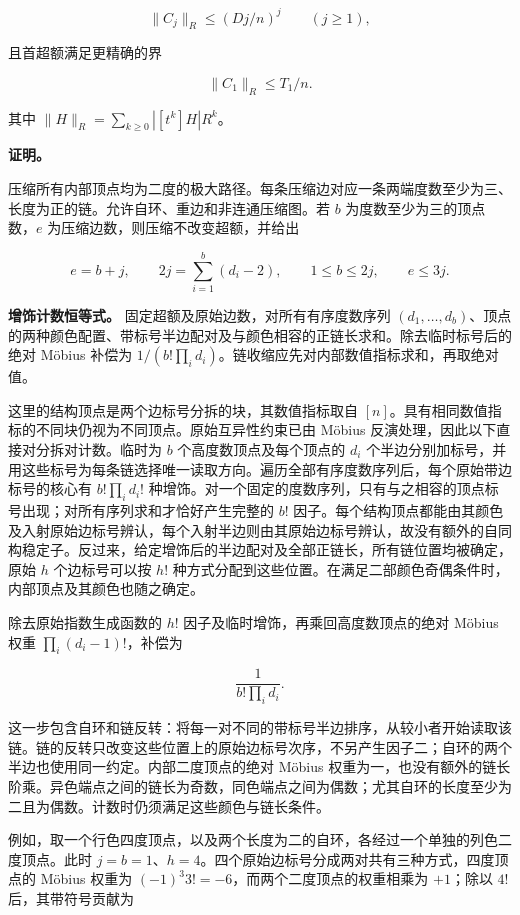 \documentclass[11pt,a4paper]{article}
\begin{document}

\begin{equation}
\|C_j\|_R\le(Dj/n)^j\qquad(j\ge1),
\tag{3.2}
\label{eq-core-activity}
\end{equation}

且首超额满足更精确的界

\[\|C_1\|_R\le T_1/n.\]

其中 \(\|H\|_R=\sum_{k\ge0}|[t^k]H|R^k\)。

\textbf{证明。}

压缩所有内部顶点均为二度的极大路径。每条压缩边对应一条两端度数至少为三、长度为正的链。允许自环、重边和非连通压缩图。若 \(b\) 为度数至少为三的顶点数，\(e\) 为压缩边数，则压缩不改变超额，并给出

\[e=b+j,\qquad
2j=\sum_{i=1}^b(d_i-2),\qquad
1\le b\le2j,\qquad e\le3j.\]

\textbf{增饰计数恒等式。} 固定超额及原始边数，对所有有序度数序列 \((d_1,\ldots,d_b)\)、顶点的两种颜色配置、带标号半边配对及与颜色相容的正链长求和。除去临时标号后的绝对 Möbius 补偿为 \(1/(b!\prod_i d_i)\)。链收缩应先对内部数值指标求和，再取绝对值。

这里的结构顶点是两个边标号分拆的块，其数值指标取自 \([n]\)。具有相同数值指标的不同块仍视为不同顶点。原始互异性约束已由 Möbius 反演处理，因此以下直接对分拆对计数。临时为 \(b\) 个高度数顶点及每个顶点的 \(d_i\) 个半边分别加标号，并用这些标号为每条链选择唯一读取方向。遍历全部有序度数序列后，每个原始带边标号的核心有 \(b!\prod_i d_i!\) 种增饰。对一个固定的度数序列，只有与之相容的顶点标号出现；对所有序列求和才恰好产生完整的 \(b!\) 因子。每个结构顶点都能由其颜色及入射原始边标号辨认，每个入射半边则由其原始边标号辨认，故没有额外的自同构稳定子。反过来，给定增饰后的半边配对及全部正链长，所有链位置均被确定，原始 \(h\) 个边标号可以按 \(h!\) 种方式分配到这些位置。在满足二部颜色奇偶条件时，内部顶点及其颜色也随之确定。

除去原始指数生成函数的 \(h!\) 因子及临时增饰，再乘回高度数顶点的绝对 Möbius 权重 \(\prod_i(d_i-1)!\)，补偿为

\[\frac1{b!\prod_i d_i}.\]

这一步包含自环和链反转：将每一对不同的带标号半边排序，从较小者开始读取该链。链的反转只改变这些位置上的原始边标号次序，不另产生因子二；自环的两个半边也使用同一约定。内部二度顶点的绝对 Möbius 权重为一，也没有额外的链长阶乘。异色端点之间的链长为奇数，同色端点之间为偶数；尤其自环的长度至少为二且为偶数。计数时仍须满足这些颜色与链长条件。

例如，取一个行色四度顶点，以及两个长度为二的自环，各经过一个单独的列色二度顶点。此时 \(j=b=1\)、\(h=4\)。四个原始边标号分成两对共有三种方式，四度顶点的 Möbius 权重为 \((-1)^3 3!=-6\)，而两个二度顶点的权重相乘为 \(+1\)；除以 \(4!\) 后，其带符号贡献为
\end{document}
